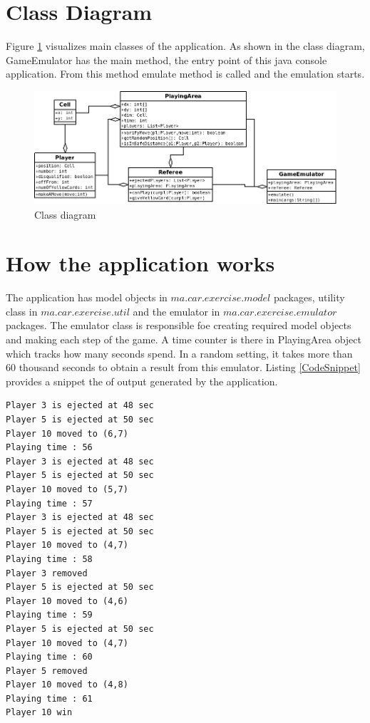 \documentclass[a4paper]{article}
\begin{document}
\section*{Class Diagram}
Figure \ref{fig:permission} visualizes main classes of the application. As shown in the class diagram, GameEmulator has the main method, the entry point of this java console application. From this method emulate method is called and the emulation starts.
\begin{figure}[ht!]
\centering
\includegraphics[width=1.2\textwidth]{class_diag.png}
\caption{Class diagram\label{fig:permission}}
\end{figure}

\section*{How the application works}
The application has model objects in $ma.car.exercise.model$ packages, utility class in $ma.car.exercise.util$ and the emulator in $ma.car.exercise.emulator$ packages. The emulator class is responsible foe creating required model objects and making each step of the game. A time counter is there in PlayingArea object which tracks how many seconds spend. In a random setting, it takes more than 60 thousand seconds to obtain a result from this emulator. Listing \ref{CodeSnippet} provides a snippet the of output generated by the application.

\begin{lstlisting}[caption=App output snippet,label=CodeSnippet]
Player 3 is ejected at 48 sec
Player 5 is ejected at 50 sec
Player 10 moved to (6,7)
Playing time : 56
Player 3 is ejected at 48 sec
Player 5 is ejected at 50 sec
Player 10 moved to (5,7)
Playing time : 57
Player 3 is ejected at 48 sec
Player 5 is ejected at 50 sec
Player 10 moved to (4,7)
Playing time : 58
Player 3 removed
Player 5 is ejected at 50 sec
Player 10 moved to (4,6)
Playing time : 59
Player 5 is ejected at 50 sec
Player 10 moved to (4,7)
Playing time : 60
Player 5 removed
Player 10 moved to (4,8)
Playing time : 61
Player 10 win
\end{lstlisting}
\end{document}
